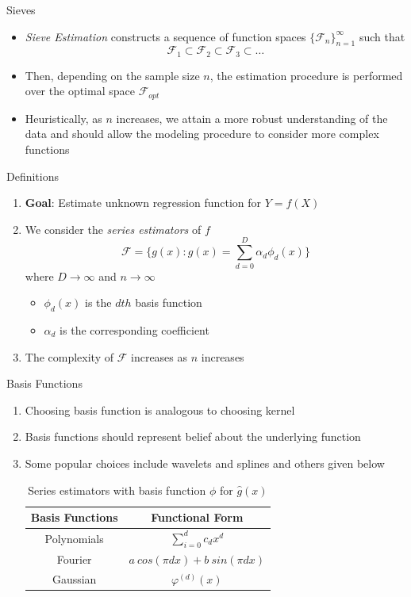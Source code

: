 \documentclass{beamer}
\begin{document}
\begin{frame}{Sieves}%
\begin{itemize}
\item \textit{Sieve Estimation} constructs a sequence of function spaces $\{\mathcal{F}_n\}_{n=1}^{\infty}$ such that $$\mathcal{F}_1\subset\mathcal{F}_2\subset\mathcal{F}_3\subset\ldots$$
\item Then, depending on the sample size $n$, the estimation procedure is performed over the optimal space $\mathcal{F}_{opt}$
\item Heuristically, as $n$ increases, we attain a more robust understanding of the data and should allow the modeling procedure to consider more complex functions
\end{itemize}
\end{frame}
\begin{frame}{Definitions}%

\begin{enumerate}
\item \textbf{Goal}: Estimate unknown regression function for $Y = f(X)$
\item We consider the \textit{series estimators} of $f$ $$ \mathcal{F} = \Big\{g(x): g(x) = \sum_{d=0}^{D} \alpha_{d} \phi_{d}(x)\Big\}$$  where $D\to\infty$ and $n\to\infty$ \pause
\begin{itemize}
  \item $\phi_d(x)$ is the $dth$ basis function
  \item $\alpha_d$ is the corresponding coefficient  
  \end{itemize}
\item The complexity of $\mathcal{F}$ increases as $n$ increases
\end{enumerate}
\end{frame}
\begin{frame}%
{Basis Functions}
\begin{enumerate}
\item Choosing basis function is analogous to choosing kernel 
\item Basis functions should represent belief about the underlying function 
\item Some popular choices include wavelets and splines and others given below 

\begin{table}[h]
\begin{center}
\begin{tabular}{|c|c|}
\hline
Basis Functions & Functional Form\\
\hline
Polynomials & $\sum_{i=0}^{d} c_d x^d$\\
Fourier &$a~cos(\pi d x) + b~sin(\pi d x)$\\
Gaussian &$\varphi^{(d)}(x)$\\
\hline
\end{tabular}
\caption{Series estimators with basis function $\phi$ for $\hat{g}(x)$}
\label{tab:basis}
\end{center}
\end{table}

\end{enumerate}
\end{frame}
\end{document}
